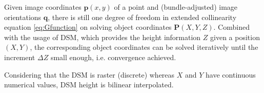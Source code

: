 Given image coordinates $\mathbf{p}(x,y)$ of a point and (bundle-adjusted) image orientations $\mathbf{q}$, there is still one degree of freedom in extended collinearity equation \eqref{eq:Gfunction} on solving object coordinates $\mathbf{P}(X,Y,Z)$. Combined with the usage of DSM, which provides the height information $Z$ given a position $(X,Y)$, the corresponding object coordinates can be solved iteratively until the increment $\Delta Z$ small enough, i.e. convergence achieved.

Considering that the DSM is raster (discrete) whereas $X$ and $Y$ have continuous numerical values, DSM height is bilinear interpolated.






















